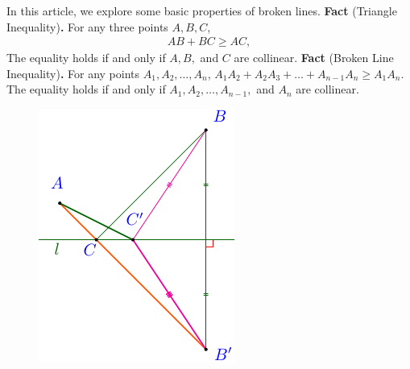 \begin{multicols}{2}
	In this article, we explore some basic properties of broken lines.
	\vskip 0.2cm
	{\color{toancuabi}\textbf{Fact} (Triangle Inequality)\textbf{.}}
	For any three points $A,B,C$, 
	\begin{align*}
		AB + BC \ge AC,
	\end{align*}
	The equality holds if and only if $A, B,$ and $C$ are collinear.
	\vskip 0.1cm
	{\color{toancuabi}\textbf{Fact} (Broken Line Inequality)\textbf{.}}
	For any points $A_1,A_2,\ldots,A_n$, $A_1A_2 + A_2A_3 + \ldots + A_{n-1} A_{n} \ge A_1 A_n.$
	The equality holds if and only if $A_1,A_2,\ldots,A_{n-1},$ and $A_n$ are collinear.
	\vskip 0.2cm
	\vskip 0.2cm
	\begin{figure}[H]
		\vspace*{-5pt}
		\centering
		\captionsetup{labelformat= empty, justification=centering}
		\includegraphics[width= 0.85\linewidth]{heron-problem-1.pdf}
		\vspace*{-5pt}

\end{figure}
\end{multicols}
